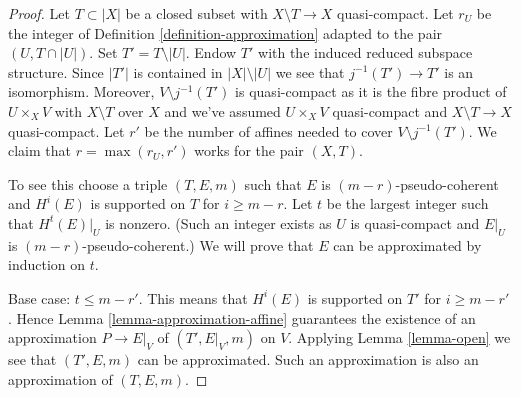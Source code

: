 \begin{proof}
Let $T \subset |X|$ be a closed subset with $X \setminus T \to X$
quasi-compact. Let $r_U$ be the integer of
Definition \ref{definition-approximation}
adapted to the pair $(U, T \cap |U|)$.
Set $T' = T \setminus |U|$. Endow $T'$ with the induced reduced
subspace structure. Since $|T'|$ is contained in $|X| \setminus |U|$
we see that $j^{-1}(T') \to T'$ is an isomorphism. Moreover,
$V \setminus j^{-1}(T')$ is quasi-compact as it is the fibre product
of $U \times_X V$ with $X \setminus T$ over $X$ and we've assumed
$U \times_X V$ quasi-compact and $X \setminus T \to X$ quasi-compact.
Let $r'$ be the number of affines needed to cover $V \setminus j^{-1}(T')$.
We claim that $r = \max(r_U, r')$ works for the pair $(X, T)$.

\medskip\noindent
To see this choose a triple $(T, E, m)$ such that $E$ is
$(m - r)$-pseudo-coherent and $H^i(E)$ is supported on $T$ for
$i \geq m - r$. Let $t$ be the largest integer such that
$H^t(E)|_U$ is nonzero. (Such an integer exists as $U$ is quasi-compact
and $E|_U$ is $(m - r)$-pseudo-coherent.)
We will prove that $E$ can be approximated by induction on $t$.

\medskip\noindent
Base case: $t \leq m - r'$. This means that $H^i(E)$ is supported
on $T'$ for $i \geq m - r'$. Hence
Lemma \ref{lemma-approximation-affine}
guarantees the existence of an approximation
$P \to E|_V$ of $(T', E|_V, m)$ on $V$.
Applying Lemma \ref{lemma-open} we see that
$(T', E, m)$ can be approximated. Such an approximation
is also an approximation of $(T, E, m)$.


\end{proof}
